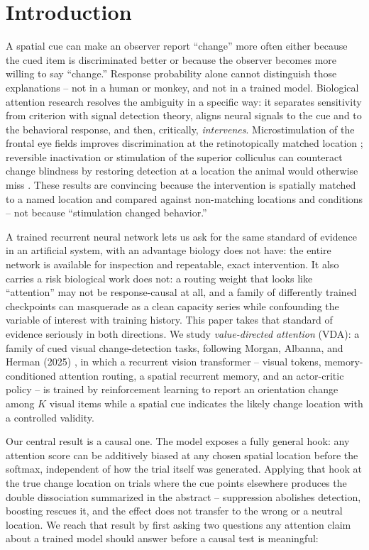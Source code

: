 \documentclass[10pt]{article}
\begin{document}
\section{Introduction}
A spatial cue can make an observer report ``change'' more often either because the cued item is discriminated better or because the observer becomes more willing to say ``change.'' Response probability alone cannot distinguish those explanations -- not in a human or monkey, and not in a trained model. Biological attention research resolves the ambiguity in a specific way: it separates sensitivity from criterion with signal detection theory, aligns neural signals to the cue and to the behavioral response, and then, critically, \emph{intervenes}. Microstimulation of the frontal eye fields improves discrimination at the retinotopically matched location \cite{moore2003}; reversible inactivation or stimulation of the superior colliculus can counteract change blindness by restoring detection at a location the animal would otherwise miss \cite{cavanaugh2004}. These results are convincing because the intervention is spatially matched to a named location and compared against non-matching locations and conditions -- not because ``stimulation changed behavior.''

A trained recurrent neural network lets us ask for the same standard of evidence in an artificial system, with an advantage biology does not have: the entire network is available for inspection and repeatable, exact intervention. It also carries a risk biological work does not: a routing weight that looks like ``attention'' may not be response-causal at all, and a family of differently trained checkpoints can masquerade as a clean capacity series while confounding the variable of interest with training history. This paper takes that standard of evidence seriously in both directions. We study \emph{value-directed attention} (VDA): a family of cued visual change-detection tasks, following Morgan, Albanna, and Herman (2025) \cite{mah2025}, in which a recurrent vision transformer -- visual tokens, memory-conditioned attention routing, a spatial recurrent memory, and an actor-critic policy -- is trained by reinforcement learning to report an orientation change among $K$ visual items while a spatial cue indicates the likely change location with a controlled validity.

Our central result is a causal one. The model exposes a fully general hook: any attention score can be additively biased at any chosen spatial location before the softmax, independent of how the trial itself was generated. Applying that hook at the true change location on trials where the cue points elsewhere produces the double dissociation summarized in the abstract -- suppression abolishes detection, boosting rescues it, and the effect does not transfer to the wrong or a neutral location. We reach that result by first asking two questions any attention claim about a trained model should answer before a causal test is meaningful:
\end{document}
